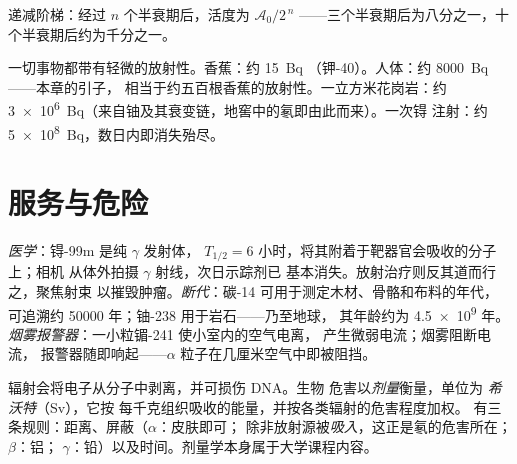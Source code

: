 \begin{omfigure}

{\small 递减阶梯：经过 $n$ 个半衰期后，活度为
$\mathcal A_0/2^{\,n}$ ——三个半衰期后为八分之一，十个半衰期后约为千分之一。}
\end{omfigure}

\begin{example}[数量级]\label{ex:g11:nucleus-radioactivity:orders}
一切事物都带有轻微的放射性。香蕉：约 \qty{15}{Bq}
（钾-40）。人体：约 \qty{8000}{Bq}——本章的引子，
相当于约五百根香蕉的放射性。一立方米花岗岩：约
\qty{3e6}{Bq}（来自铀及其衰变链，地窖中的氡即由此而来）。一次锝
注射：约 \qty{5e8}{Bq}，数日内即消失殆尽。
\end{example}

\section{服务与危险}

\begin{example}[不稳定原子核的三种用途]\label{ex:g11:nucleus-radioactivity:uses}
\emph{医学}：锝-99m 是纯 $\gamma$ 发射体，
$T_{1/2} = 6$ 小时，将其附着于靶器官会吸收的分子上；相机
从体外拍摄 $\gamma$ 射线，次日示踪剂已
基本消失。放射治疗则反其道而行之，聚焦射束
以摧毁肿瘤。\emph{断代}：碳-14 可用于测定木材、骨骼和布料的年代，
可追溯约 \num{50000} 年；铀-238 用于岩石——乃至地球，
其年龄约为 \num{4.5e9} 年。\emph{烟雾报警器}：一小粒镅-241 使小室内的空气电离，
产生微弱电流；烟雾阻断电流，
报警器随即响起——$\alpha$ 粒子在几厘米空气中即被阻挡。
\end{example}

\begin{remark}[剂量与希沃特]\label{rem:g11:nucleus-radioactivity:dose}
辐射会将电子从分子中剥离，并可损伤 DNA。生物
危害以\emph{剂量}衡量，单位为
\emph{希沃特}（\unit{Sv}），它按
每千克组织吸收的能量，并按各类辐射的危害程度加权。
有三条规则：距离、屏蔽（$\alpha$：皮肤即可；
除非放射源被\emph{吸入}，这正是氡的危害所在；$\beta$：铝；
$\gamma$：铅）以及时间。剂量学本身属于大学课程内容。
\end{remark}

